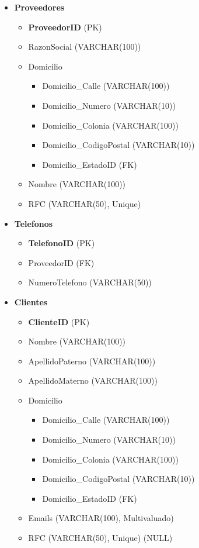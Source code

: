\documentclass[10pt,openany]{book}
\begin{document}
\begin{itemize}
    \item \textbf{Proveedores}
        \begin{itemize}
            \item \textbf{ProveedorID} (PK)
            \item RazonSocial (VARCHAR(100))
            \item Domicilio
            \begin{itemize}
                \item Domicilio\_Calle (VARCHAR(100))
                \item Domicilio\_Numero (VARCHAR(10))
                \item Domicilio\_Colonia (VARCHAR(100))
                \item Domicilio\_CodigoPostal (VARCHAR(10))
                \item Domicilio\_EstadoID (FK)
            \end{itemize}
            \item Nombre (VARCHAR(100))
            \item RFC (VARCHAR(50), Unique)
        \end{itemize}
        
    \item \textbf{Telefonos}
        \begin{itemize}
            \item \textbf{TelefonoID} (PK)
            \item ProveedorID (FK)
            \item NumeroTelefono (VARCHAR(50))
        \end{itemize}
        
    \item \textbf{Clientes}
        \begin{itemize}
            \item \textbf{ClienteID} (PK)
            \item Nombre (VARCHAR(100))
            \item ApellidoPaterno (VARCHAR(100))
            \item ApellidoMaterno (VARCHAR(100))
            \item Domicilio
            \begin{itemize}
                \item Domicilio\_Calle (VARCHAR(100))
                \item Domicilio\_Numero (VARCHAR(10))
                \item Domicilio\_Colonia (VARCHAR(100))
                \item Domicilio\_CodigoPostal (VARCHAR(10))
                \item Domicilio\_EstadoID (FK)
            \end{itemize}
            \item Emails (VARCHAR(100), Multivaluado)
            \item RFC (VARCHAR(50), Unique) (NULL)
        \end{itemize}
        

\end{itemize}
\end{document}
